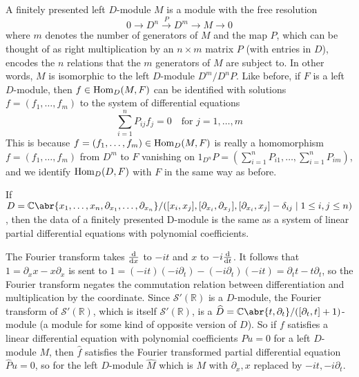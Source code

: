 \documentclass[../../rtnotes.tex]{subfiles}
\begin{document}
A finitely presented left $D$-module $M$ is a module with the free resolution
\[0\to D^n\xrightarrow P D^m\to M\to 0\]
where $m$ denotes the number of generators of $M$ and the map $P$, which can be thought of as right multiplication by an $n\times m$ matrix $P$ (with entries in $D$), encodes the $n$ relations that the $m$ generators of $M$ are subject to. In other words, $M$ is isomorphic to the left $D$-module $D^m/D^nP$. Like before, if $F$ is a left $D$-module, then $f\in \operatorname{Hom}_D(M,F)$ can be identified with solutions $f = (f_1,\dots,f_m)$ to the system of differential equations
\[\sum_{i=1}^nP_{ij}f_j = 0\quad\text{for }j = 1,\dots,m\]
This is because $f = (f_1,\dots,f_m)\in\operatorname{Hom}_D(M,F)$ is really a homomorphism $f = (f_1,\dots,f_m)$ from $D^m$ to $F$ vanishing on $1_{D^n}P = (\sum_{i=1}^nP_{i1},\dots,\sum_{i=1}^nP_{im})$, and we identify $\operatorname{Hom}_D(D,F)$ with $F$ in the same way as before.

If $D = \mathbb C\abr{x_1,\dots,x_n,\partial_{x_1},\dots,\partial_{x_n}}/([x_i,x_j],[\partial_{x_i},\partial_{x_j}],[\partial_{x_i},x_j]-\delta_{ij}\mid 1\leq i,j\leq n)$, then the data of a finitely presented D-module is the same as a system of linear partial differential equations with polynomial
coefficients.

The Fourier transform takes $\dv{x}$ to $-it$ and $x$ to $-i\dv{t}$. It follows that $1 = \partial_xx-x\partial_x$ is sent to $1 = (-it)(-i\partial_t)-(-i\partial_t)(-it) = \partial_tt-t\partial_t$, so the Fourier transform negates the commutation relation between differentiation and multiplication by the coordinate. Since $\mathcal S'(\mathbb R)$ is a $D$-module, the Fourier transform of $\mathcal S'(\mathbb R)$, which is itself $\mathcal S'(\mathbb R)$, is a $\widehat D = \mathbb C\abr{t,\partial_t}/([\partial_t,t]+1)$-module (a module for some kind of opposite version of $D$). So if $f$ satisfies a linear differential equation with polynomial coefficients $Pu = 0$ for a left $D$-module $M$, then $\hat f$ satisfies the Fourier transformed partial differential equation $\hat P\hat u = 0$, so for the left $D$-module $\widehat M$ which is $M$ with $\partial_x,x$ replaced by $-it,-i\partial_t$.
\end{document}
